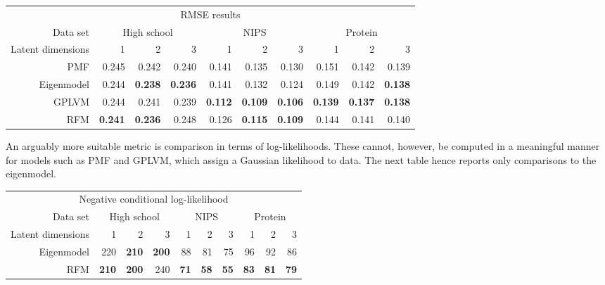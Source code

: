 \begin{center}
  \begin{tabular}{r | r r r | r r r | r r r}
    \multicolumn{10}{c}{RMSE results} \\
    \addlinespace[2pt]
    Data set & \multicolumn{3}{c|}{High school} & \multicolumn{3}{c|}{NIPS} & \multicolumn{3}{c}{Protein} \\
    Latent dimensions & 1 & 2 & 3 & 1 & 2 & 3 & 1 & 2 & 3 \\
    \midrule
    PMF                   & 0.245 & 0.242 & 0.240 & 0.141 & 0.135 & 0.130 & 0.151 & 0.142 & 0.139 \\
    Eigenmodel            & 0.244 & \textbf{0.238} & \textbf{0.236} & 0.141 & 0.132 & 0.124 & 0.149 & 0.142 & \textbf{0.138} \\
    GPLVM                 &0.244 & 0.241 & 0.239 & \textbf{0.112} & \textbf{0.109} & \textbf{0.106} & \textbf{0.139} & \textbf{0.137} & \textbf{0.138} \\
    RFM & \textbf{0.241} & \textbf{0.236} & 0.248 & 0.126 & \textbf{0.115} & \textbf{0.109} & 0.144 & 0.141 & 0.140 \\
  \end{tabular}
\end{center}

An arguably more suitable metric is comparison in terms of log-likelihoods. These cannot, however, be computed in a meaningful manner for
models such as PMF and GPLVM, which assign a Gaussian likelihood to data. The next table hence reports only comparisons to the eigenmodel.
\begin{center}
  \begin{tabular}{r | r r r | r r r | r r r}
     \multicolumn{10}{c}{Negative conditional log-likelihood} \\
     \addlinespace[2pt]
     Data set & \multicolumn{3}{c|}{High school} & \multicolumn{3}{c|}{NIPS} & \multicolumn{3}{c}{Protein} \\
    Latent dimensions & 1 & 2 & 3 & 1 & 2 & 3 & 1 & 2 & 3 \\
    \midrule
    Eigenmodel & 220 & \textbf{210} & \textbf{200} & 88 & 81 & 75 & 96 & 92 & 86 \\
    RFM        & \textbf{210} & \textbf{200} & 240 & \textbf{71} & \textbf{58} & \textbf{55} & \textbf{83} & \textbf{81} & \textbf{79}  \\
  \end{tabular}
\end{center}

